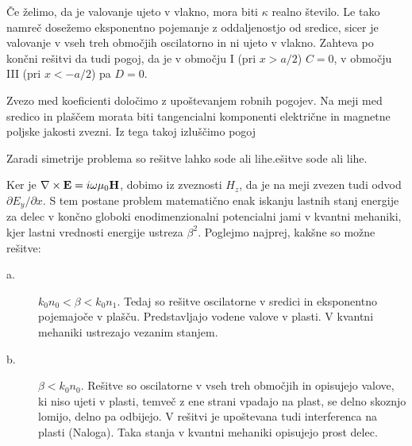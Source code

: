 Če želimo, da je valovanje ujeto v vlakno, mora biti $\kappa$ realno število.
Le tako namreč dosežemo eksponentno pojemanje z oddaljenostjo od sredice,
sicer je valovanje v vseh treh območjih oscilatorno in ni ujeto v vlakno. Zahteva po 
končni rešitvi da tudi pogoj, da je v območju I (pri $x>a/2$) $C=0$, 
v območju III (pri $x<-a/2$) pa $D=0$. 

Zvezo med koeficienti določimo z upoštevanjem robnih pogojev. Na meji
med sredico in plaščem morata biti tangencialni komponenti 
električne in magnetne poljske jakosti zvezni. Iz tega takoj 
izluščimo pogoj 



Zaradi simetrije problema so rešitve lahko sode ali lihe.ešitve sode ali lihe. 

Ker je $\nabla\times{\bf E}=i\omega\mu_{0}{\bf H}$,
dobimo iz zveznosti $H_{z}$, da je na meji zvezen tudi odvod $\partial E_{y}/\partial x$.
S tem postane problem matematično enak iskanju lastnih stanj energije
za delec v končno globoki enodimenzionalni potencialni jami v kvantni
mehaniki, kjer lastni vrednosti energije ustreza $\beta^{2}$. Poglejmo
najprej, kakšne so možne rešitve:
\begin{description}
\item [{a.}] $k_{0}n_{0}<\beta<k_{0}n_{1}$. Tedaj so rešitve oscilatorne
v sredici in eksponentno pojemajoče v plašču. Predstavljajo vodene
valove v plasti. V kvantni mehaniki ustrezajo vezanim stanjem.
\item [{b.}] $\beta<k_{0}n_{0}$. Rešitve so oscilatorne v vseh treh območjih
in opisujejo valove, ki niso ujeti v plasti, temveč z ene strani vpadajo
na plast, se delno skoznjo lomijo, delno pa odbijejo. V rešitvi je
upoštevana tudi interferenca na plasti (Naloga). Taka stanja v kvantni
mehaniki opisujejo prost delec. 
\end{description}

